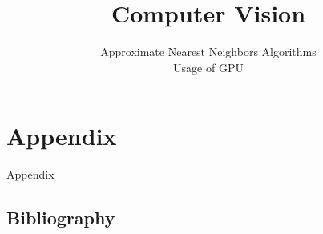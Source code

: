 
\title{Computer Vision}
\subtitle{Approximate Nearest Neighbors Algorithms \\ Usage of GPU}




	
	

%	

%	
	
%	
	
	
	
	\section*{Appendix}
	\begin{frame}
		\Huge
		Appendix
	\end{frame}
%	
	\subsection*{Bibliography}
		
	
		
